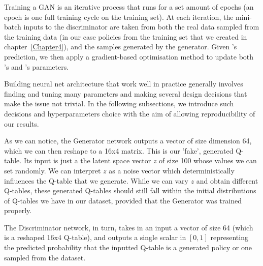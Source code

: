 Training a GAN is an iterative process that runs for a set amount of epochs (an epoch is one full training cycle on the training set).
At each iteration, the mini-batch inputs to the discriminator  are taken from both the real data sampled from the training data (in our case policies from the training set that we created in chapter~\ref{Chapter4}), and the samples generated by the generator.
Given 's prediction, we then apply a gradient-based optimisation method to update both 's and 's parameters.

Building neural net architecture that work well in practice generally involves finding and tuning many parameters and making several design decisions that make the issue not trivial. In the following subsections, we introduce such decisions and hyperparameters choice with the aim of allowing reproducibility of our results.

As we can notice, the Generator network outputs a vector of size dimension 64, which we can then reshape to a 16x4 matrix. This is our 'fake', generated Q-table. Its input is just a the latent space vector $z$ of size 100 whose values we can set randomly. We can interpret $z$ as a noise vector which deterministically influences the Q-table that we generate. While we can vary $z$ and obtain different Q-tables, these generated Q-tables should still fall within the initial distributions of Q-tables we have in our dataset, provided that the Generator was trained properly.

The Discriminator network, in turn, takes in an input a vector of size 64 (which is a reshaped 16x4 Q-table), and outputs a single scalar in $[0,1]$ representing the predicted probability that the inputted Q-table is a generated policy or one sampled from the dataset.


